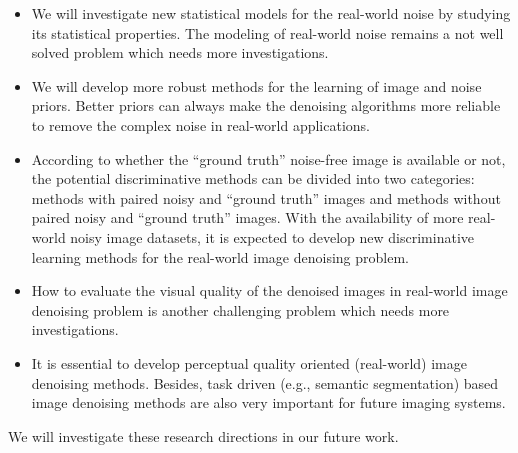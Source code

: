\begin{itemize}
\item We will investigate new statistical models for the real-world noise by studying its statistical properties. The modeling of real-world noise remains a not well solved problem which needs more investigations.

\item We will develop more robust methods for the learning of image and noise priors. Better priors can always make the denoising algorithms more reliable to remove the complex noise in real-world applications.

\item According to whether the ``ground truth'' noise-free image is available or not, the potential discriminative methods can be divided into two categories: methods with paired noisy and ``ground truth'' images and methods without paired noisy and ``ground truth'' images. With the availability of more real-world noisy image datasets, it is expected to develop new discriminative learning methods for the real-world image denoising problem. 

\item How to evaluate the visual quality of the denoised images in real-world image denoising problem is another challenging problem which needs more investigations.

\item It is essential to develop perceptual quality oriented (real-world) image denoising methods. Besides, task driven (e.g., semantic segmentation) based image denoising methods are also very important for future imaging systems.

\end{itemize}

We will investigate these research directions in our future work.
